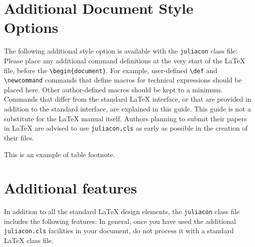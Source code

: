 \documentclass{juliacon}
\begin{document}
\section{Additional Document Style Options}
\label{sec:additional_doc}
%
The following additional style option is available with the \verb|juliacon|  class file:
\vskip 6pt
Please place any additional command definitions at the very start of
the \LaTeX{} file, before the \verb|\begin{document}|. For example, user-defined
\verb|\def|  and \verb|\newcommand|   commands that define macros for
technical expressions should be placed here. Other author-defined
macros should be kept to a minimum.
\vskip 6pt
Commands that differ from the standard \LaTeX{} interface, or that
are provided in addition to the standard interface, are explained in
this guide. This guide is not a substitute for the \LaTeX{} manual itself.
Authors planning to submit their papers in \LaTeX{} are advised to use
\verb|juliacon.cls|  as early as possible in the creation of their files.

%
%
%
%
\begin{table}[t]
\label{tab:symbols}
\begin{tabnote}
This is an example of table footnote.
\end{tabnote}
\end{table}

\section{Additional features}
\label{sec:additional_faci}
In addition to all the standard \LaTeX{} design elements, the \verb|juliacon|  class file includes the following features:
In general, once you have used the additional \verb|juliacon.cls| facilities
in your document, do not process it with a standard \LaTeX{} class
file.
\end{document}
